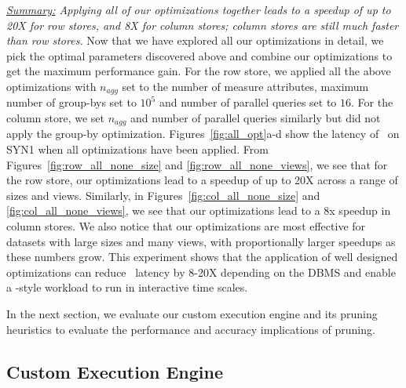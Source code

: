 

{\em \underline{Summary:} Applying all of our optimizations together
leads to a speedup of up to 20X for row stores, and 8X for column stores;
column stores are still much faster than row stores.}
Now that we have explored all our optimizations in detail, we pick the optimal
parameters discovered above and combine our optimizations to get the maximum
performance gain. 
For the row store, we applied all the above optimizations with $n_{agg}$ set to
the number of measure attributes, maximum number of group-bys set to $10^5$ and
number of parallel queries set to $16$.
For the column store, we set $n_{agg}$ and number of parallel queries similarly
but did not apply the group-by optimization. 
Figures~\ref{fig:all_opt}a-d show the latency of \VizRecDB\ on SYN1 when all
optimizations have been applied.
From Figures~\ref{fig:row_all_none_size} and \ref{fig:row_all_none_views}, we
see that for the row store, our optimizations lead to a speedup of up to 20X
across a range of sizes and views.
Similarly, in Figures~\ref{fig:col_all_none_size}
and \ref{fig:col_all_none_views}, we see that our optimizations lead to a 8x
speedup in column stores. 
We also notice that our optimizations are most effective for datasets with large
sizes and many views, with proportionally larger speedups as these numbers grow.
This experiment shows that the application of well designed optimizations
can reduce \VizRecDB\ latency by 8-20X depending on the DBMS and enable a
\VizRecDB-style workload to run in interactive time scales.

In the next section, we evaluate our custom execution engine and
its pruning heuristics to evaluate the performance and accuracy implications of
pruning.

\subsection{Custom Execution Engine}
\label{sec:custom_execution_engine}

